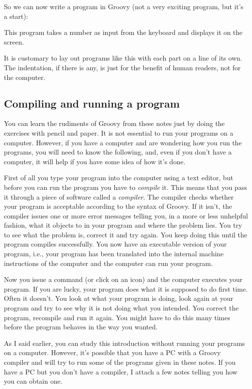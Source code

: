 So we can now write a program in Groovy (not a very exciting program,
but it's a start):


This program takes a number as input from the keyboard and displays it
on the screen.

It is customary to lay out programs like this with each part on a line
of its own. The indentation, if there is any, is just for the benefit of human readers, not for the computer.

\subsection{Compiling and running a program}

You can learn the rudiments of Groovy from these notes just by doing the
exercises with pencil and paper.  It is not essential to run your programs
on a computer.  However, if you have a computer and are wondering how
you run the programs, you will need to know the following, and, even if you don't have
a computer, it will help if you have some idea of how it's done.

First of all you type your program into the computer using a text editor, but
before you can run the program you have to \emph{compile} it.  This means that
you pass it through a piece
of software called a \emph{compiler}.  The compiler checks whether your program
is acceptable according to the syntax of Groovy.  If it isn't, the compiler
issues one or more error messages telling you, in a more or less unhelpful
fashion, what it objects to in your program and where the problem lies.
You try to see what the problem is, correct it and try again.  You keep
doing this until the program compiles successfully.  You now have an
executable version of your program, i.e., your program has been translated
into the internal machine instructions of the computer and the computer
can run your program.

Now you issue a command (or click on an icon) and the computer executes
your program.  If you are lucky, your program does what it is supposed
to do first time.  Often it doesn't.  You look at what your program is
doing, look again at your program and try to see why it is not doing what
you intended.  You correct the program, recompile and run it again.
You might have to do this many times before the program behaves in the way
you wanted.

As I said earlier, you can study this introduction without running your
programs on a computer.  However, it's possible that you have a PC with
a Groovy compiler and will try to run some of the programs given in these
notes. 
If you have a PC but you don't have a compiler, I attach a few notes telling
you how you can obtain one.

